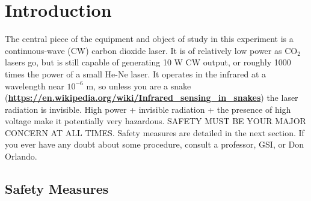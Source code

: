 \documentclass{../lab}
\begin{document}
\section{Introduction}

The central piece of the equipment and object of study in this experiment is a continuous-wave (CW) carbon dioxide laser. It is of relatively low power as CO$_2$ lasers go, but is still capable of generating 10 W CW output, or roughly 1000 times the power of a small He-Ne laser. It operates in the infrared at a wavelength near $10^{-6}$ m, so unless you are a snake (\href{https://en.wikipedia.org/wiki/Infrared\_sensing\_in\_snakes}{\textbf{https://en.wikipedia.org/wiki/Infrared\_sensing\_in\_snakes}}) the laser radiation is invisible. High power + invisible radiation + the presence of high voltage make it potentially very hazardous. SAFETY MUST BE YOUR MAJOR CONCERN AT ALL TIMES. Safety measures are detailed in the next section. If you ever have any doubt about some procedure, consult a professor, GSI, or Don Orlando.

\subsection{Safety Measures}
\end{document}
